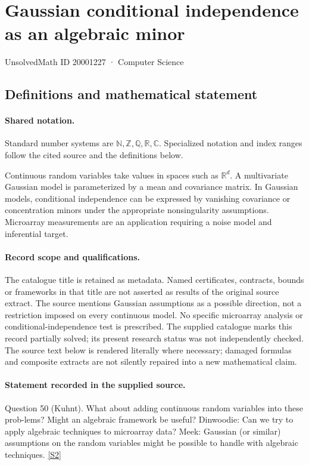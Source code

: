 \documentclass[11pt]{article}
\newcommand{\sref}[2]{\hyperlink{source:#1:#2}{[S#2]}}
\begin{document}
\setcounter{section}{20001226}
\section{Gaussian conditional independence as an algebraic minor}\label{20001227}
{\small\sffamily UnsolvedMath ID 20001227 · Computer Science}
\subsection{Definitions and mathematical statement}

\paragraph{Shared notation.}Standard number systems are $\mathbb N,\mathbb Z,\mathbb Q,\mathbb R,\mathbb C$. Specialized notation and index ranges follow the cited source and the definitions below.


Continuous random variables take values in spaces such as $\mathbb R^d$. A multivariate Gaussian model is parameterized by a mean and covariance matrix. In Gaussian models, conditional independence can be expressed by vanishing covariance or concentration minors under the appropriate nonsingularity assumptions. Microarray measurements are an application requiring a noise model and inferential target.
\paragraph{Record scope and qualifications.}
The catalogue title is retained as metadata. Named certificates, contracts, bounds or frameworks in that title are not asserted as results of the original source extract.
The source mentions Gaussian assumptions as a possible direction, not a restriction imposed on every continuous model. No specific microarray analysis or conditional-independence test is prescribed. The supplied catalogue marks this record partially solved; its present research status was not independently checked.
The source text below is rendered literally where necessary; damaged formulas and composite extracts are not silently repaired into a new mathematical claim.
\paragraph{Statement recorded in the supplied source.}
Question 50 (Kuhnt). What about adding continuous random variables into these prob-lems? Might an algebraic framework be useful? Dinwoodie: Can we try to apply algebraic techniques to microarray data? Meek: Gaussian (or similar) assumptions on the random variables might be possible to handle with algebraic techniques. \sref{20001227}{2}
\end{document}
